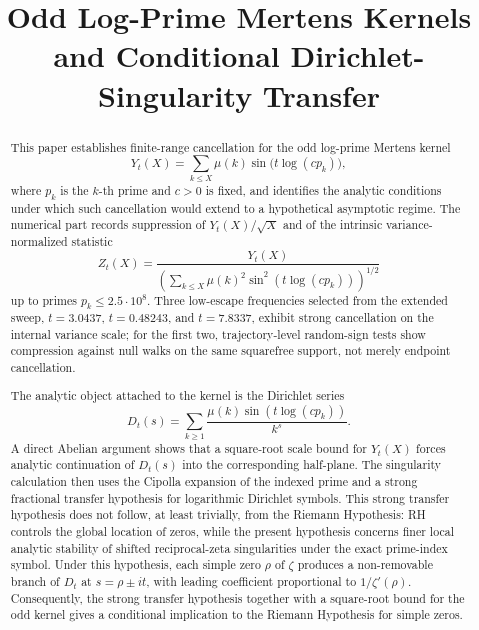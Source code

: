 \documentclass[11pt]{amsart}
\title{Odd Log-Prime Mertens Kernels and Conditional Dirichlet-Singularity Transfer}
\author{}
\date{}
\numberwithin{equation}{section}
\theoremstyle{plain}
\theoremstyle{definition}
\theoremstyle{remark}
\begin{document}
\begin{abstract}
This paper establishes finite-range cancellation for the odd log-prime
Mertens kernel
\begin{equation}
Y_t(X)=
\sum_{k\le X}\mu(k)\sin\bigl(t\log(c p_k)\bigr),
\label{eq:abstract_kernel}
\end{equation}
where $p_k$ is the $k$-th prime and $c>0$ is fixed, and identifies the
analytic conditions under which such cancellation would extend to a
hypothetical asymptotic regime.  The numerical part records suppression of
$Y_t(X)/\sqrt X$ and of the intrinsic variance-normalized statistic
\begin{equation}
Z_t(X)=
\frac{Y_t(X)}{\left(\sum_{k\le X}\mu(k)^2\sin^2(t\log(c p_k))\right)^{1/2}}
\label{eq:abstract_Zt}
\end{equation}
up to primes $p_k\le 2.5\cdot 10^8$.  Three low-escape frequencies selected
from the extended sweep, $t=3.0437$, $t=0.48243$, and $t=7.8337$, exhibit
strong cancellation on the internal variance scale; for the first two,
trajectory-level random-sign tests show compression against null walks on
the same squarefree support, not merely endpoint cancellation.

The analytic object attached to the kernel is the Dirichlet series
\begin{equation}
D_t(s)=\sum_{k\ge1}\frac{\mu(k)\sin(t\log(c p_k))}{k^s}.
\label{eq:abstract_dirichlet_series}
\end{equation}
A direct Abelian argument shows that a square-root scale bound for $Y_t(X)$
forces analytic continuation of $D_t(s)$ into the corresponding half-plane.
The singularity calculation then uses the Cipolla expansion of the indexed
prime and a strong fractional transfer hypothesis for logarithmic Dirichlet
symbols.  This strong transfer hypothesis does not follow, at least
trivially, from the Riemann Hypothesis: RH controls the global location of
zeros, while the present hypothesis concerns finer local analytic stability
of shifted reciprocal-zeta singularities under the exact prime-index symbol.
Under this hypothesis, each simple zero $\rho$ of $\zeta$ produces a
non-removable branch of $D_t$ at $s=\rho\pm it$, with leading coefficient
proportional to $1/\zeta'(\rho)$.  Consequently, the strong transfer
hypothesis together with a square-root bound for the odd kernel gives a
conditional implication to the Riemann Hypothesis for simple zeros.
\end{abstract}

\maketitle
\end{document}
